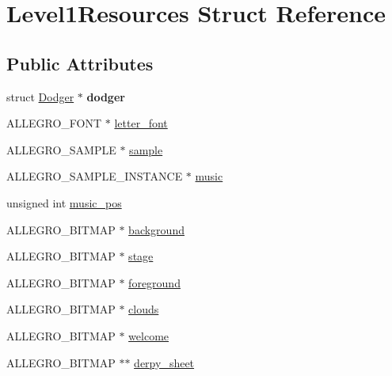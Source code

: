 \hypertarget{structLevel1Resources}{\section{Level1\+Resources Struct Reference}
\label{structLevel1Resources}
}
\subsection*{Public Attributes}
\begin{DoxyCompactItemize}
\item 
\hypertarget{structLevel1Resources_a5dab8a99e6ed8d2bdad67fbc32dd4921}{struct \hyperlink{structDodger}{Dodger} $\ast$ {\bfseries dodger}}\label{structLevel1Resources_a5dab8a99e6ed8d2bdad67fbc32dd4921}

\item 
A\+L\+L\+E\+G\+R\+O\+\_\+\+F\+O\+N\+T $\ast$ \hyperlink{structLevel1Resources_a0ce5e6261f8f1dcea79533b46b1b70f1}{letter\+\_\+font}
\item 
A\+L\+L\+E\+G\+R\+O\+\_\+\+S\+A\+M\+P\+L\+E $\ast$ \hyperlink{structLevel1Resources_af8eaef9b18591372ed4d8a9aae3f4405}{sample}
\item 
A\+L\+L\+E\+G\+R\+O\+\_\+\+S\+A\+M\+P\+L\+E\+\_\+\+I\+N\+S\+T\+A\+N\+C\+E $\ast$ \hyperlink{structLevel1Resources_a328f872b3a4a75a3f0c1c4a081d231ea}{music}
\item 
unsigned int \hyperlink{structLevel1Resources_a312c499697c6245f45a556d91e541f02}{music\+\_\+pos}
\item 
A\+L\+L\+E\+G\+R\+O\+\_\+\+B\+I\+T\+M\+A\+P $\ast$ \hyperlink{structLevel1Resources_a45be13fc84e30d810b9baa897456fb3d}{background}
\item 
A\+L\+L\+E\+G\+R\+O\+\_\+\+B\+I\+T\+M\+A\+P $\ast$ \hyperlink{structLevel1Resources_ac9a1fff6cf6e265817484c859650d039}{stage}
\item 
A\+L\+L\+E\+G\+R\+O\+\_\+\+B\+I\+T\+M\+A\+P $\ast$ \hyperlink{structLevel1Resources_adfe13dc44e93deb9563219ebafe450f6}{foreground}
\item 
A\+L\+L\+E\+G\+R\+O\+\_\+\+B\+I\+T\+M\+A\+P $\ast$ \hyperlink{structLevel1Resources_a600f35107c2716e7814ad9106821b75f}{clouds}
\item 
A\+L\+L\+E\+G\+R\+O\+\_\+\+B\+I\+T\+M\+A\+P $\ast$ \hyperlink{structLevel1Resources_acbc46643b03108212b8a975a1fac5f03}{welcome}
\item 
A\+L\+L\+E\+G\+R\+O\+\_\+\+B\+I\+T\+M\+A\+P $\ast$$\ast$ \hyperlink{structLevel1Resources_a378dea75ef4682624c7aac6845f113f2}{derpy\+\_\+sheet}
$$
\end{DoxyCompactItemize}
